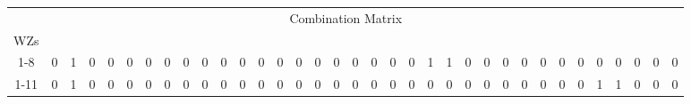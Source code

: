 \documentclass[a4paper,3p,times,authoryear]{elsarticle}
\begin{document}
\begin{table}[H]
{\begin{tabular}{|l|l|l|l|l|l|l|l|l|l|l|l|l|l|l|l|l|l|l|l|l|l|l|l|l|l|l|l|l|l|l|l|l|l|l|}
\hline
\multicolumn{35}{c}{Combination  Matrix} \\ 
\multicolumn{1}{c|}{WZs} & \multicolumn{1}{c}{} & \multicolumn{1}{c}{} & \multicolumn{1}{c}{} & \multicolumn{1}{c}{} & \multicolumn{1}{c}{} & \multicolumn{1}{c}{} & \multicolumn{1}{c}{} & \multicolumn{1}{c}{} & \multicolumn{1}{c}{} & \multicolumn{1}{c}{} & \multicolumn{1}{c}{} & \multicolumn{1}{c}{} & \multicolumn{1}{c}{} & \multicolumn{1}{c}{} & \multicolumn{1}{c}{} & \multicolumn{1}{c}{} & \multicolumn{1}{c}{} & \multicolumn{1}{c}{} & \multicolumn{1}{c}{} & \multicolumn{1}{c}{} & \multicolumn{1}{c}{} & \multicolumn{1}{c}{} & \multicolumn{1}{c}{} & \multicolumn{1}{c}{} & \multicolumn{1}{c}{} & \multicolumn{1}{c}{} & \multicolumn{1}{c}{} & \multicolumn{1}{c}{} & \multicolumn{1}{c}{} & \multicolumn{1}{c}{} & \multicolumn{1}{c}{} & \multicolumn{1}{c}{} & \multicolumn{1}{c}{} & \multicolumn{1}{c}{} \\ 
\hline
\multicolumn{1}{|c|}{ 1-8} & \multicolumn{1}{c|}{0} & \multicolumn{1}{c|}{\cellcolor{blue!25}1} & \multicolumn{1}{c|}{0} & \multicolumn{1}{c|}{0} & \multicolumn{1}{c|}{0} & \multicolumn{1}{c|}{0} & \multicolumn{1}{c|}{0} & \multicolumn{1}{c|}{0} & \multicolumn{1}{c|}{0} & \multicolumn{1}{c|}{0} & \multicolumn{1}{c|}{0} & \multicolumn{1}{c|}{0} & \multicolumn{1}{c|}{0} & \multicolumn{1}{c|}{0} & \multicolumn{1}{c|}{0} & \multicolumn{1}{c|}{0} & \multicolumn{1}{c|}{0} & \multicolumn{1}{c|}{0} & \multicolumn{1}{c|}{0} & \multicolumn{1}{c|}{0} & \multicolumn{1}{c|}{\cellcolor{blue!25}1} & \multicolumn{1}{c|}{\cellcolor{blue!25}1} & \multicolumn{1}{c|}{0} & \multicolumn{1}{c|}{0} & \multicolumn{1}{c|}{0} & \multicolumn{1}{c|}{0} & \multicolumn{1}{c|}{0} & \multicolumn{1}{c|}{0} & \multicolumn{1}{c|}{0} & \multicolumn{1}{c|}{0} & \multicolumn{1}{c|}{0} & \multicolumn{1}{c|}{0} & \multicolumn{1}{c|}{0} & \multicolumn{1}{c|}{0} \\ 
\hline
\multicolumn{1}{|c|}{ 1-11} & \multicolumn{1}{c|}{0} & \multicolumn{1}{c|}{\cellcolor{blue!25}1} & \multicolumn{1}{c|}{0} & \multicolumn{1}{c|}{0} & \multicolumn{1}{c|}{0} & \multicolumn{1}{c|}{0} & \multicolumn{1}{c|}{0} & \multicolumn{1}{c|}{0} & \multicolumn{1}{c|}{0} & \multicolumn{1}{c|}{0} & \multicolumn{1}{c|}{0} & \multicolumn{1}{c|}{0} & \multicolumn{1}{c|}{0} & \multicolumn{1}{c|}{0} & \multicolumn{1}{c|}{0} & \multicolumn{1}{c|}{0} & \multicolumn{1}{c|}{0} & \multicolumn{1}{c|}{0} & \multicolumn{1}{c|}{0} & \multicolumn{1}{c|}{0} & \multicolumn{1}{c|}{0} & \multicolumn{1}{c|}{0} & \multicolumn{1}{c|}{0} & \multicolumn{1}{c|}{0} & \multicolumn{1}{c|}{0} & \multicolumn{1}{c|}{0} & \multicolumn{1}{c|}{0} & \multicolumn{1}{c|}{0} & \multicolumn{1}{c|}{0} & \multicolumn{1}{c|}{\cellcolor{blue!25}1} & \multicolumn{1}{c|}{\cellcolor{blue!25}1} & \multicolumn{1}{c|}{0} & \multicolumn{1}{c|}{0} & \multicolumn{1}{c|}{0} \\ 

\end{tabular}}
\end{table}
\end{document}

